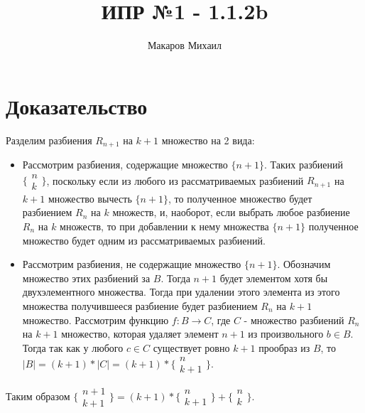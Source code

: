 \documentclass{article}
\title{ИПР №1 - 1.1.2b}
\author{Макаров Михаил}
\date{}
\begin{document}
	\maketitle

	\section{Доказательство}
	Разделим разбиения $ R_{n + 1} $ на $k + 1$ множество на 2 вида:
	\begin{itemize}
	\item Рассмотрим разбиения, содержащие множество $\{ n + 1 \}$.
		Таких разбиений \( \big\{ \substack{n \\ k} \big\} \), 
		поскольку если 	из любого из рассматриваемых разбиений $ R_{n + 1} $ на $k + 1$ множество вычесть $\{ n + 1 \}$,
		то полученное множество будет разбиением $ R_{n} $ на $k$ множеств, и, наоборот,
		если выбрать любое разбиение $ R_{n} $ на $k$ множеств, то при добавлении к нему множества $\{ n + 1 \}$
		полученное множество будет одним из рассматриваемых разбиений.
	\item Рассмотрим разбиения, не содержащие множество $\{ n + 1 \}$. Обозначим множество этих разбиений за $B$.
		Тогда $ n + 1 $ будет элементом хотя бы двухэлементного множества.
		Тогда при удалении этого элемента из этого множества получившееся разбиение
		будет разбиением $ R_{n} $ на $k + 1$ множество. Рассмотрим функцию $f: B \rightarrow C$, где 
		$C$ - множество разбиений $ R_{n} $ на $k + 1$ множество, которая удаляет элемент $n + 1$ из произвольного
		$b \in B$. Тогда так как у любого $c \in C$ существует ровно $k + 1$ прообраз из $B$, 
		то $|B| = (k + 1) * |C| = (k + 1) * \big\{ \substack{n \\ k + 1} \big\} $.
	\end{itemize}	 
	Таким образом \( \big\{ \substack{n + 1 \\ k + 1} \big\} = (k + 1) * \big\{ \substack{n \\ k + 1} \big\} + 
	\big\{ \substack{n \\ k} \big\} \).
\end{document}

